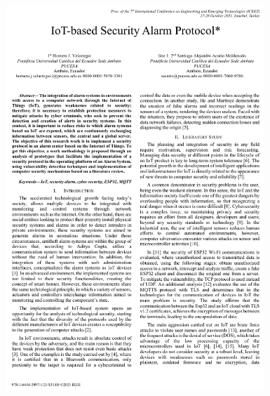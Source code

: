 
\begin{figure}[ht]
    \centering
    \includegraphics[width=0.87\textwidth]{5.-Publicaciones/Certificados/6.png}
\end{figure}

